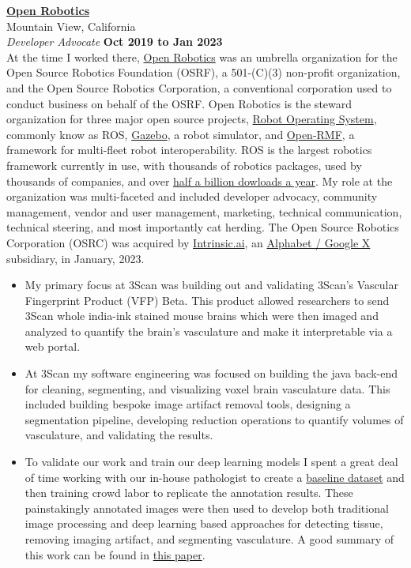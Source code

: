 \documentclass[10pt]{article}
\newenvironment{outerlist}[1][\enskip\textbullet]%
        {\begin{itemize}[#1]}{\end{itemize}%
         \vspace{-.6\baselineskip}}
\begin{document}
\href{http://www.openrobotics.org/}{\textbf{Open Robotics}} \\
Mountain View, California \\
\textit{Developer Advocate}%
        \hfill \textbf{Oct 2019 to Jan 2023}  \\


At the time I worked there, \href{http://www.openrobotics.org}{Open Robotics} was an umbrella organization for the Open Source Robotics Foundation (OSRF), a 501-(C)(3) non-profit organization, and the Open Source Robotics Corporation, a conventional corporation used to conduct business on behalf of the OSRF. Open Robotics is the steward organization for three major open source projects, \href{https://ros.org/}{Robot Operating System}, commonly know as ROS, \href{https://gazebosim.org/home}{Gazebo}, a robot simulator, and \href{https://www.open-rmf.org/}{Open-RMF}, a framework for multi-fleet robot interoperability. ROS is the largest robotics framework currently in use, with thousands of robotics  packages, used by thousands of companies, and over \href{http://download.ros.org/downloads/metrics/metrics-report-2022-07.pdf}{half a billion dowloads a year}. My role at the organization was multi-faceted and included developer advocacy, community management, vendor and user management, marketing, technical communication, technical steering, and most importantly cat herding. The Open Source Robotics Corporation (OSRC) was acquired by \href{https://intrinsic.ai/}{Intrinsic.ai}, an \href{https://x.company/}{Alphabet / Google X} subsidiary, in January, 2023.   
\begin{outerlist}
\item My primary focus at 3Scan was building out and validating 3Scan's Vascular Fingerprint Product (VFP) Beta. This product allowed researchers to send 3Scan whole india-ink stained mouse brains which were then imaged and analyzed to quantify the brain's vasculature and make it interpretable via a web portal. 
\item At 3Scan my software engineering was focused on building the java back-end for cleaning, segmenting, and visualizing voxel brain vasculature data. This included building bespoke image artifact removal tools, designing a segmentation pipeline, developing reduction operations to quantify volumes of vasculature, and validating the results. 
\item To validate our work and train our deep learning models I spent a great deal of time working with our in-house pathologist to create a \href{http://www.3scan.com/open-data/}{baseline dataset} and then training crowd labor to replicate the annotation results. These painstakingly annotated images were then used to develop both traditional image processing and deep learning based approaches for detecting tissue, removing imaging artifact, and segmenting vasculature. A good summary of this work can be found in \href{https://github.com/osbd/osbd-2018/raw/master/proceedings/S09204_4274.pdf}{this paper}. 
\end{outerlist}
\end{document}
